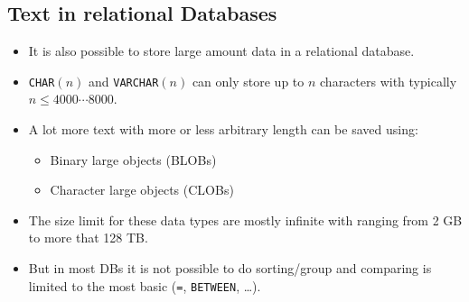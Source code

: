         \subsection{Text in relational Databases} %
        	\begin{itemize}
        		\item It is also possible to store large amount data in a relational database.
        		\item \lstinline|CHAR|\((n)\) and \lstinline|VARCHAR|\((n)\) can only store up to \(n\) characters with typically \( n \leq 4000\cdots8000 \).
        		\item A lot more text with more or less arbitrary length can be saved using:
        			\begin{itemize}
        				\item Binary large objects (BLOBs)
        				\item Character large objects (CLOBs)
        			\end{itemize}
        		\item The size limit for these data types are mostly infinite with ranging from 2 GB to more that 128 TB.
        		\item But in most DBs it is not possible to do sorting/group and comparing is limited to the most basic (\lstinline|=|, \lstinline|BETWEEN|, \dots).
        	\end{itemize}


